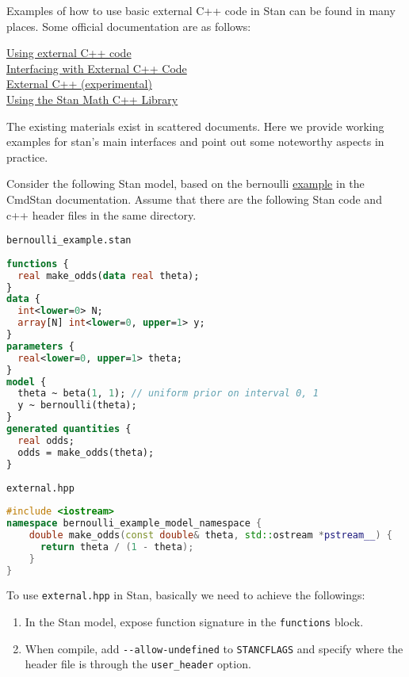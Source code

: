 \documentclass[11pt]{article}
\begin{document}
Examples of how to use basic external C++ code in Stan can be found in many places. Some official documentation are as follows:

\href{https://mc-stan.org/docs/cmdstan-guide/using-external-cpp-code.html}{Using external C++ code}\\
\href{https://mc-stan.org/rstan/articles/external.html}{Interfacing with External C++ Code}\\
\href{https://pystan2.readthedocs.io/en/latest/external_cpp.html}{External C++ (experimental)}\\
\href{https://cran.r-project.org/web/packages/StanHeaders/vignettes/stanmath.html}{Using the Stan Math C++ Library}

The existing materials exist in scattered documents. Here we provide working examples for stan's main interfaces and point out some noteworthy aspects in practice. 

Consider the following Stan model, based on the bernoulli \href{https://mc-stan.org/docs/cmdstan-guide/using-external-cpp-code.html}{example} in the CmdStan documentation. Assume that there are the following Stan code and c++ header files in the same directory. 

\verb|bernoulli_example.stan|
\begin{lstlisting}[language=Stan, style=lgeneral]
functions {
  real make_odds(data real theta);
}
data {
  int<lower=0> N;
  array[N] int<lower=0, upper=1> y;
}
parameters {
  real<lower=0, upper=1> theta;
}
model {
  theta ~ beta(1, 1); // uniform prior on interval 0, 1
  y ~ bernoulli(theta);
}
generated quantities {
  real odds;
  odds = make_odds(theta);
}
\end{lstlisting}

\verb|external.hpp|
\begin{lstlisting}[language=c++, style=lgeneral]
#include <iostream>
namespace bernoulli_example_model_namespace {
	double make_odds(const double& theta, std::ostream *pstream__) {
	  return theta / (1 - theta);
	}
}
\end{lstlisting}


To use \verb|external.hpp| in Stan, basically we need to achieve the followings:

\begin{enumerate}
	\item In the Stan model, expose function signature in the \verb|functions| block. 
	\item When compile, add \verb|--allow-undefined| to \verb|STANCFLAGS| and specify where the header file is through the \verb|user_header| option. 
\end{enumerate}
\end{document}
